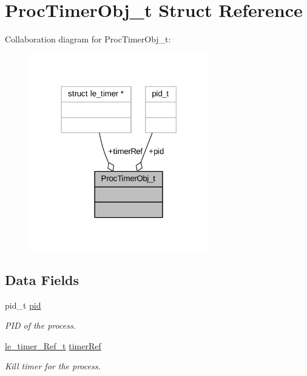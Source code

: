 \hypertarget{struct_proc_timer_obj__t}{}\section{Proc\+Timer\+Obj\+\_\+t Struct Reference}
\label{struct_proc_timer_obj__t}


Collaboration diagram for Proc\+Timer\+Obj\+\_\+t\+:
\nopagebreak
\begin{figure}[H]
\begin{center}
\leavevmode
\includegraphics[width=222pt]{struct_proc_timer_obj__t__coll__graph}
\end{center}
\end{figure}
\subsection*{Data Fields}
\begin{DoxyCompactItemize}
\item 
pid\+\_\+t \hyperlink{struct_proc_timer_obj__t_ae55399add0cda13944b5f6e0a043593d}{pid}
\begin{DoxyCompactList}\small\item\em P\+ID of the process. \end{DoxyCompactList}\item 
\hyperlink{le__timer_8h_a763fa6992488cdce3b5a820817094838}{le\+\_\+timer\+\_\+\+Ref\+\_\+t} \hyperlink{struct_proc_timer_obj__t_a9350c951e08e9f46914f55168b21e936}{timer\+Ref}
\begin{DoxyCompactList}\small\item\em Kill timer for the process. \end{DoxyCompactList}\end{DoxyCompactItemize}


